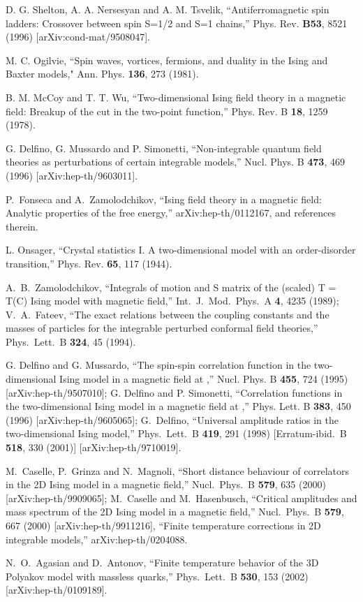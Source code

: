 \documentclass[a4paper,aps,prd,superscriptaddress,showpacs,showkeys]{revtex4}
\begin{document}
\begin{thebibliography}{99}
D. G. Shelton, A. A. Nersesyan and A. M. Tsvelik,
``Antiferromagnetic spin ladders: Crossover between spin S=1/2 and S=1
chains,''
Phys. Rev. {\bf B53}, 8521 (1996)
[arXiv:cond-mat/9508047].

M. C. Ogilvie, 
``Spin waves, vortices, fermions, and duality in the Ising
and Baxter models,"
Ann. Phys. {\bf 136}, 273 (1981).

B. M. McCoy and T. T. Wu, ``Two-dimensional Ising field theory in a
magnetic field: Breakup of the cut in the two-point function,''
Phys. Rev. B {\bf 18}, 1259 (1978). 

G. Delfino, G. Mussardo and P. Simonetti, 
``Non-integrable quantum field
theories as perturbations of certain integrable models,''
Nucl. Phys. B {\bf 473},  469 (1996) 
[arXiv:hep-th/9603011].

P.~Fonseca and A.~Zamolodchikov,
``Ising field theory in a magnetic field: Analytic properties of the free
energy,''
arXiv:hep-th/0112167, and references therein.

L. Onsager,
``Crystal statistics I. A two-dimensional
model with an order-disorder transition,''
Phys. Rev. {\bf 65}, 117 (1944).

A.~B.~Zamolodchikov,
``Integrals of motion and S matrix of the (scaled) T = T(C) Ising model
with magnetic field,''
Int.\ J.\ Mod.\ Phys.\ A {\bf 4}, 4235 (1989);
V.~A.~Fateev,
``The exact relations between the coupling constants and the masses of
particles for the integrable perturbed conformal field theories,'' 
Phys.\ Lett.\ B {\bf 324}, 45 (1994).

G. Delfino and G. Mussardo, 
``The spin-spin correlation function in the
two-dimensional Ising model in a magnetic field at \coordHE{},''
Nucl. Phys. B {\bf 455}, 724 (1995)
[arXiv:hep-th/9507010];
G. Delfino and P. Simonetti, 
``Correlation functions in the two-dimensional
Ising model in a magnetic field at \coordHE{},''
Phys. Lett. B {\bf 383}, 450 (1996) 
[arXiv:hep-th/9605065];
G.~Delfino,
``Universal amplitude ratios in the two-dimensional Ising model,''
Phys.\ Lett.\ B {\bf 419}, 291 (1998)
[Erratum-ibid.\ B {\bf 518}, 330 (2001)]
[arXiv:hep-th/9710019].

M.~Caselle, P.~Grinza and N.~Magnoli,
``Short distance behaviour of correlators in the 2D Ising model in a
magnetic field,''
Nucl.\ Phys.\ B {\bf 579}, 635 (2000)
[arXiv:hep-th/9909065];
M.~Caselle and M.~Hasenbusch,
``Critical amplitudes and mass spectrum of the 2D Ising model in a
magnetic field,''
Nucl.\ Phys.\ B {\bf 579}, 667 (2000)
[arXiv:hep-th/9911216],
``Finite temperature corrections in 2D integrable models,''
arXiv:hep-th/0204088.

N.~O.~Agasian and D.~Antonov,
``Finite temperature behavior of the 3D Polyakov model with massless
quarks,'' 
Phys.\ Lett.\ B {\bf 530}, 153 (2002) 
[arXiv:hep-th/0109189].

\end{thebibliography}
\end{document}
